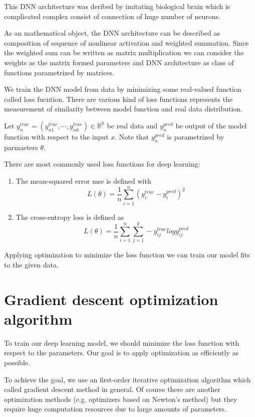 \documentclass[11pt]{article}
\begin{document}
	This DNN architecture was deribed by imitating biological brain which is complicated complex consist of connection of huge number of neurons.

	As an mathematical object, the DNN architecture can be described as composition of sequence of nonlinear activation and weighted summation. Since the weighted sum can be written as matrix multiplication we can consider the weights as the matrix formed parameters and DNN architecture as class of functions parametrized by matrices.

	We train the DNN model from data by minimizing some real-valued function called loss fucntion. There are various kind of loss functions represents the measurement of similarity between model function and real data distribution.

	Let $y_n^{true}=(y_{n1}^{true},\cdots, y_{nk}^{true})\in\mathbb{R}^k$ be real data and $y_n^{pred}$ be output of the model function with respect to the input $x$. Note that $y_n^{pred}$ is parametrized by parmaeters $\theta$.

	There are most commonly used loss functions for deep learning:

	\begin{enumerate}		
		\item The mean-squared error mse is defined with
		\begin{equation*}
			L(\theta)=\frac{1}{n}\sum_{i=1}^n (y_i^{true}-y_i^{pred})^2
		\end{equation*}
		\item The cross-entropy loss is defined as
		\begin{equation*}
			L(\theta)=\frac{1}{n}\sum_{i=1}^n \sum_{j=1}^{k}-y_{ij}^{true}log y_{ij}^{pred}
		\end{equation*}
	\end{enumerate}

	Applying optimization to minimize the loss function we can train our model fits to the given data.

	\section{Gradient descent optimization algorithm}
	To train our deep learning model, we should minimize the loss function with respect to the parameters. Our goal is to apply optimization as efficiently as possible.

	To achieve the goal, we use an first-order iterative optimization algorithm which called gradient descent method in general. Of course there are another optimization methods (e.g. optimizers based on Newton's method) but they require huge computation resources due to large amounts of parameters.
\end{document}
